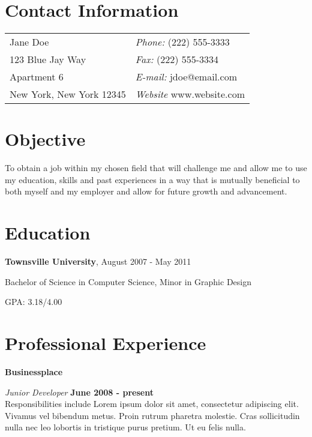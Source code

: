 \documentclass[margin,line]{res}
\newenvironment{list1}{
  \begin{list}{\ding{113}}{%
      \setlength{\itemsep}{0in}
      \setlength{\parsep}{0in} \setlength{\parskip}{0in}
      \setlength{\topsep}{0in} \setlength{\partopsep}{0in} 
      \setlength{\leftmargin}{0.17in}}}{\end{list}}
\begin{document}

\begin{resume}
\section{\sc Contact Information}
\vspace{.05in}
\begin{tabular}{@{}p{2in}p{4in}}
Jane Doe                   & {\it Phone:}  (222) 555-3333 \\            
123 Blue Jay Way           & {\it Fax:}    (222) 555-3334 \\         
Apartment 6                & {\it E-mail:}  jdoe@email.com\\       
New York, New York 12345   & {\it Website} www.website.com\\     
\end{tabular}


\section{\sc Objective}
To obtain a job within my chosen field that will challenge me and allow me to use my education, skills and past experiences in a way that is mutually beneficial to both myself and my employer and allow for future growth and advancement.

\section{\sc Education}
{\bf Townsville University}, August 2007 - May 2011\\
\vspace*{-.1in}
\begin{list1}
\item[] Bachelor of Science in Computer Science, Minor in Graphic Design
\item[] GPA: 3.18/4.00 
\end{list1}

\section{\sc Professional Experience}
{\bf Businessplace}

\vspace{-.3cm}
{\em Junior Developer} \hfill {\bf June 2008 - present}\\
Responsibilities include Lorem ipsum dolor sit amet, consectetur adipiscing elit. Vivamus vel bibendum metus. Proin rutrum pharetra molestie. Cras sollicitudin nulla nec leo lobortis in tristique purus pretium. Ut eu felis nulla.


\end{resume}
\end{document}
